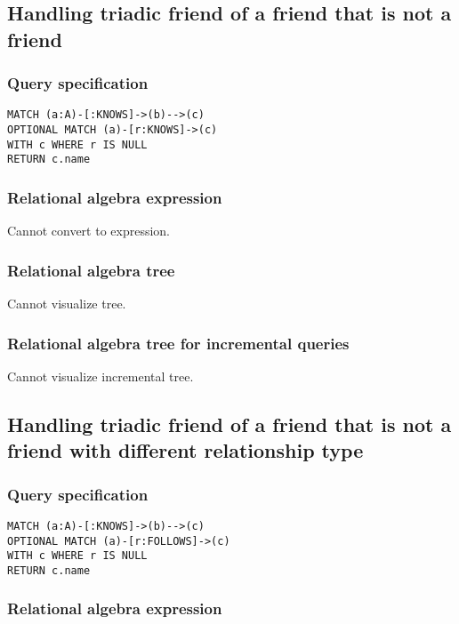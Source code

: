 \subsection{Handling triadic friend of a friend that is not a friend}

\subsubsection*{Query specification}

\begin{lstlisting}
MATCH (a:A)-[:KNOWS]->(b)-->(c)
OPTIONAL MATCH (a)-[r:KNOWS]->(c)
WITH c WHERE r IS NULL
RETURN c.name
\end{lstlisting}

\subsubsection*{Relational algebra expression}

Cannot convert to expression.

\subsubsection*{Relational algebra tree}

Cannot visualize tree.

\subsubsection*{Relational algebra tree for incremental queries}

Cannot visualize incremental tree.

\subsection{Handling triadic friend of a friend that is not a friend with different relationship type}

\subsubsection*{Query specification}

\begin{lstlisting}
MATCH (a:A)-[:KNOWS]->(b)-->(c)
OPTIONAL MATCH (a)-[r:FOLLOWS]->(c)
WITH c WHERE r IS NULL
RETURN c.name
\end{lstlisting}

\subsubsection*{Relational algebra expression}

